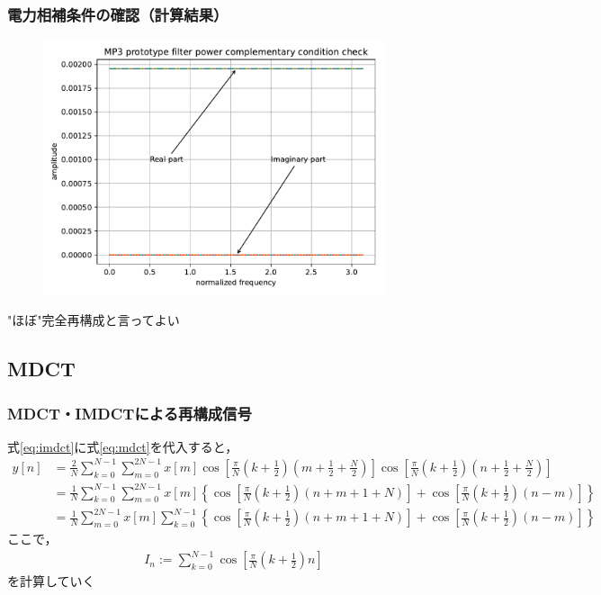 \documentclass[14pt,xcolor=dvipsnames,table,dvipdfmx]{beamer}
\begin{document}
\begin{frame}[c]
    \frametitle{電力相補条件の確認（計算結果）}
    \begin{figure}
        \includegraphics[width=100mm]{./figs/mp3_encoder_prototype_filter_power_complementary_condition.pdf}
    \end{figure}
    \vspace{-10pt}
    "ほぼ"完全再構成と言ってよい
\end{frame}

\subsection{MDCT} \label{sec:proofs_mdct}

\begin{frame}[c]
    \frametitle{MDCT・IMDCTによる再構成信号}
    式\eqref{eq:imdct}に式\eqref{eq:mdct}を代入すると，
    \scriptsize
    \begin{align*}
        y[n] &= \frac{2}{N} \sum_{k = 0}^{N - 1} \sum_{m = 0}^{2N - 1} x[m] \cos \left[ \frac{\pi}{N} \left( k + \frac{1}{2} \right) \left( m + \frac{1}{2} + \frac{N}{2} \right) \right] \cos \left[ \frac{\pi}{N} \left( k + \frac{1}{2} \right) \left( n + \frac{1}{2} + \frac{N}{2} \right) \right] \\
        &= \frac{1}{N} \sum_{k = 0}^{N - 1} \sum_{m = 0}^{2N - 1} x[m] \left\{ \cos \left[ \frac{\pi}{N} \left( k + \frac{1}{2} \right) \left( n + m + 1 + N \right) \right] + \cos \left[ \frac{\pi}{N} \left( k + \frac{1}{2} \right) \left( n - m \right) \right] \right\} \\
        &= \frac{1}{N} \sum_{m = 0}^{2N - 1} x[m] \sum_{k = 0}^{N - 1} \left\{ \cos \left[ \frac{\pi}{N} \left( k + \frac{1}{2} \right) \left( n + m + 1 + N \right) \right] + \cos \left[ \frac{\pi}{N} \left( k + \frac{1}{2} \right) \left( n - m \right) \right] \right\}
    \end{align*}
    \normalsize
    ここで，
    \begin{align}
        I_{n} := \sum_{k = 0}^{N - 1} \cos \left[ \frac{\pi}{N} \left( k + \frac{1}{2} \right) n \right]
    \end{align}
    を計算していく
\end{frame}
\end{document}
